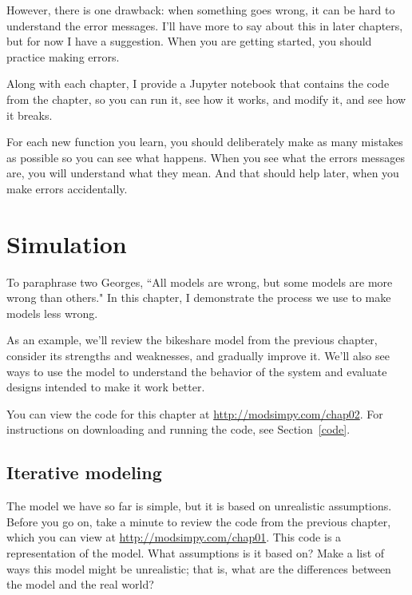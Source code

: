 \documentclass[12pt]{book}
\theoremstyle{exercise}
\begin{document}
However, there is one drawback: when something goes wrong, it can be hard to understand the error messages.  I'll have more to say about this in later chapters, but for now I have a suggestion.  When you are getting started, you should practice making errors.

Along with each chapter, I provide a Jupyter notebook that contains the code from the chapter, so you can run it, see how it works, and modify it, and see how it breaks.


For each new function you learn, you should deliberately make as many mistakes as possible so you can see what happens.  When you see what the errors messages are, you will understand what they mean.  And that should help later, when you make errors accidentally.



\chapter{Simulation}
\label{chap02}

To paraphrase two Georges, ``All models are wrong, but some models are more wrong than others."  In this chapter, I demonstrate the process we use to make models less wrong.


As an example, we'll review the bikeshare model from the previous chapter, consider its strengths and weaknesses, and gradually improve it.  We'll also see ways to use the model to understand the behavior of the system and evaluate designs intended to make it work better.


You can view the code for this chapter at \url{http://modsimpy.com/chap02}.  For instructions on downloading and running the code, see Section~\ref{code}.


\section{Iterative modeling}

The model we have so far is simple, but it is based on unrealistic assumptions.  Before you go on, take a minute to review the code from the previous chapter, which you can view at \url{http://modsimpy.com/chap01}.  This code is a representation of the model.  What assumptions is it based on?  Make a list of ways this model might be unrealistic; that is, what are the differences between the model and the real world?
\end{document}
